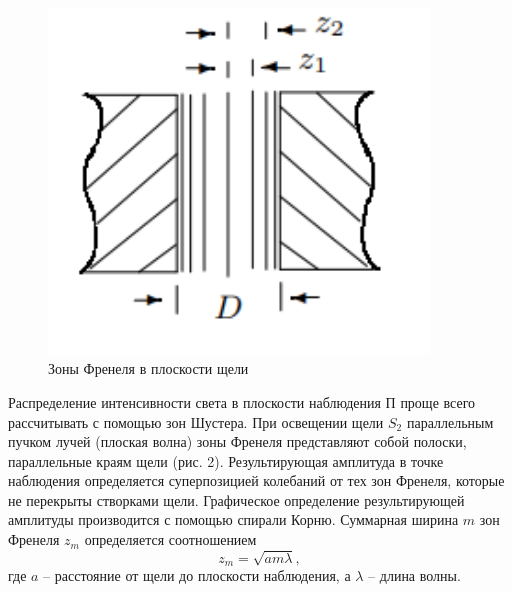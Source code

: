 \documentclass[a4paper,12pt]{article}
\begin{document}
\begin{figure}\label{fig: Schuster zones}
    \begin{center}
    \vspace{-20pt}
        \includegraphics[width = 0.9\textwidth]{Schuster zones.png}
    \end{center}
    \caption{Зоны Френеля в плоскости щели}
\end{figure}
Распределение интенсивности света в плоскости наблюдения $П$ проще всего рассчитывать с помощью зон Шустера. При освещении щели $S_2$ параллельным пучком лучей (плоская волна) зоны Френеля представляют собой полоски, параллельные краям щели (рис. 2). Результирующая амплитуда в точке наблюдения определяется суперпозицией колебаний от тех зон Френеля, которые не перекрыты створками щели. Графическое определение результирующей амплитуды производится с помощью спирали Корню. Суммарная ширина $m$ зон Френеля $z_m$ определяется соотношением
\begin{equation}\label{eq: first m Schuster zones' width}
    z_m = \sqrt{am\lambda},
\end{equation}
где $a$ -- расстояние от щели до плоскости наблюдения, а $\lambda$ -- длина волны.
\end{document}
